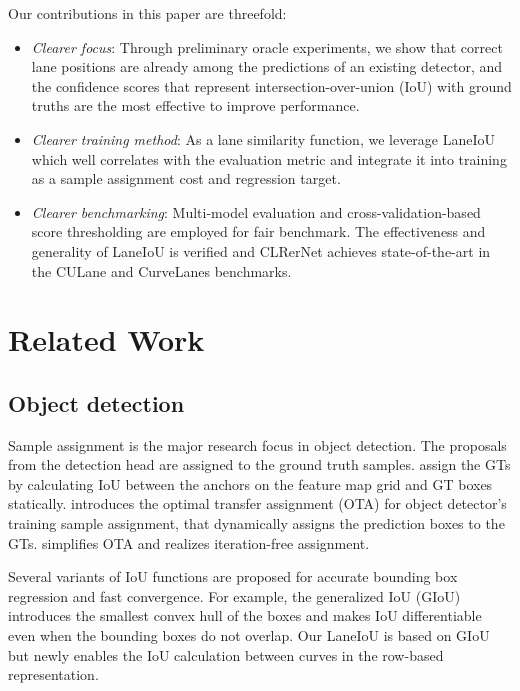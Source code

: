 \documentclass[10pt,twocolumn,letterpaper]{article}
\begin{document}
Our contributions in this paper are threefold:
\begin{itemize}
	\item \textit{Clearer focus}: Through preliminary oracle experiments, we show that correct lane positions are already among the predictions of an existing detector, and the confidence scores that represent intersection-over-union (IoU) with ground truths are the most effective to improve performance.
	\item \textit{Clearer training method}: As a lane similarity function, we leverage LaneIoU which well correlates with the evaluation metric and integrate it into training as a sample assignment cost and regression target.
	\item \textit{Clearer benchmarking}: Multi-model evaluation and cross-validation-based score thresholding are employed for fair benchmark. 
The effectiveness and generality of LaneIoU is verified and CLRerNet achieves state-of-the-art in the CULane and CurveLanes benchmarks.
\end{itemize}



\section{Related Work}
\label{sec:relatedwork}

\subsection{Object detection}
 Sample assignment is the major research focus in object detection. The proposals from the detection head are assigned to the ground truth samples. \cite{fasterrcnn, fpn, maskrcnn, retinanet} assign the GTs by calculating IoU between the anchors on the feature map grid and GT boxes statically. \cite{ota} introduces the optimal transfer assignment (OTA) for object detector's training sample assignment, that dynamically assigns the prediction boxes to the GTs. \cite{YOLOX} simplifies OTA and realizes iteration-free assignment. 

Several variants of IoU functions \cite{Rezatofighi_2018_CVPR, diou, ciou} are proposed for accurate bounding box regression and fast convergence. For example, the generalized IoU (GIoU) \cite{Rezatofighi_2018_CVPR} introduces the smallest convex hull of the boxes and makes IoU differentiable even when the bounding boxes do not overlap. Our LaneIoU is based on GIoU but newly enables the IoU calculation between curves in the row-based representation.
\end{document}
